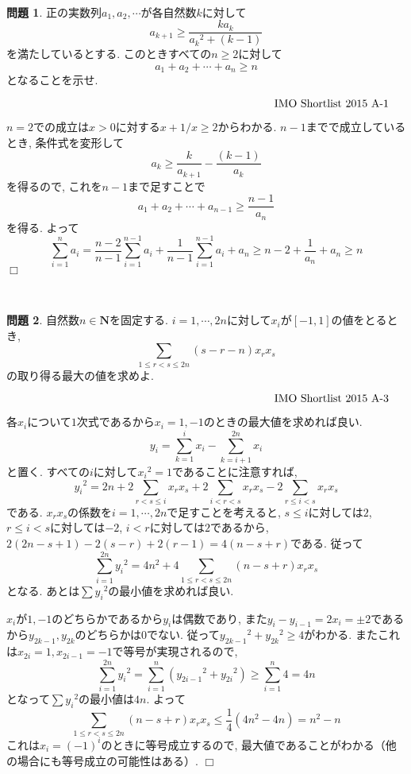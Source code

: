 \documentclass[uplatex, a5paper]{jsarticle}
\makeatletter
\theoremstyle{definition}
\newtheorem{prob}{問題}
\renewenvironment{proof}[1][\proofname]{
  \pushQED{\qed}%
  \normalfont \topsep6\p@\@plus6\p@\relax
  \trivlist
  \item[\hskip\labelsep
    #1\@addpunct{\textbf{.}}]\ignorespaces
}{%
  \popQED\endtrivlist\@endpefalse
}
\providecommand{\proofname}{証明}
\def\qed{\hfill $\Box$}
\makeatother
\begin{document}
\begin{proof}

\end{proof}



\




\newpage\begin{prob}
正の実数列$a_1,a_2,\cdots $が各自然数$k$に対して
$$
 a_{k+1} \geq \frac{ka_k}{{a_k}^2+(k-1)}
$$
を満たしているとする.
このときすべての$n\geq 2$に対して
$$
a_1 + a_2 + \cdots + a_n \geq n
$$
となることを示せ.

$\rightline{IMO Shortlist 2015 A-1}$

\end{prob}


\begin{proof}
$n=2$での成立は$x>0$に対する$x+1/x\geq 2$からわかる.
$n-1$までで成立しているとき, 条件式を変形して
$$
a_k \geq \frac{k}{a_{k+1}} - \frac{(k-1)}{a_k}
$$
を得るので, これを$n-1$まで足すことで
$$
a_1+a_2+\cdots +a_{n-1} \geq \frac{n-1}{a_n}
$$
を得る.
よって
$$
\sum _{i=1}^n a_i = \frac{n-2}{n-1}\sum _{i=1}^{n-1} a_i + \frac{1}{n-1}\sum _{i=1}^{n-1} a_i + a_n \geq n-2 + \frac{1}{a_n} + a_n \geq n
$$
\qed
\end{proof}






\




\newpage\begin{prob}
自然数$n\in \mathbf{N}$を固定する.
$i=1,\cdots , 2n$に対して$x_i$が$[-1,1]$の値をとるとき,
$$
\sum _{1\leq r < s \leq 2n}(s-r-n)x_rx_s
$$
の取り得る最大の値を求めよ.

$\rightline{IMO Shortlist 2015 A-3}$

\end{prob}


\begin{proof}
各$x_i$について$1$次式であるから$x_i=1,-1$のときの最大値を求めれば良い.
$$
y_i = \sum _{k=1}^i x_i - \sum _{k=i+1}^{2n}x_i
$$
と置く.
すべての$i$に対して${x_i}^2=1$であることに注意すれば,
$$
{y_i}^2 = 2n + 2\sum _{r<s\leq i}x_rx_s + 2\sum _{i<r<s}x_rx_s - 2\sum _{r\leq i < s}x_rx_s
$$
である.
$x_rx_s$の係数を$i=1,\cdots ,2n$で足すことを考えると, $s\leq i$に対しては$2$, $r\leq i <s$に対しては$-2$, $i<r$に対しては$2$であるから, $2(2n-s+1)-2(s-r)+2(r-1)=4(n-s+r)$である.
従って
$$
\sum _{i=1}^{2n}{y_i}^2 = 4n^2 + 4\sum _{1\leq r<s\leq 2n}(n-s+r)x_rx_s
$$
となる.
あとは$\sum {y_i}^2$の最小値を求めれば良い.


$x_i$が$1,-1$のどちらかであるから$y_i$は偶数であり, また$y_i -y_{i-1}=2x_i = \pm 2$であるから$y_{2k-1},y_{2k}$のどちらかは$0$でない.
従って${y_{2k-1}}^2+{y_{2k}}^2 \geq 4$がわかる.
またこれは$x_{2i}=1,x_{2i-1}=-1$で等号が実現されるので,
$$
\sum _{i=1}^{2n}{y_i}^2 = \sum _{i=1}^n ({y_{2i-1}}^2+{y_{2i}}^2) \geq \sum _{i=1}^n 4 = 4n
$$
となって$\sum {y_i}^2$の最小値は$4n$.
よって
$$
\sum _{1\leq r<s\leq 2n}(n-s+r)x_rx_s \leq \frac{1}{4}\left( 4n^2 - 4n \right) = n^2-n
$$
これは$x_i=(-1)^i$のときに等号成立するので, 最大値であることがわかる（他の場合にも等号成立の可能性はある）.
\qed
\end{proof}
\end{document}
